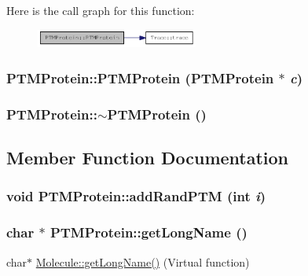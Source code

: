 Here is the call graph for this function:\nopagebreak
\begin{figure}[H]
\begin{center}
\leavevmode
\includegraphics[width=151pt]{classPTMProtein_ad7f9e5f107659b4c8a0c675f2aeb7b8b_cgraph}
\end{center}
\end{figure}
\hypertarget{classPTMProtein_a6a642aeb0eb0d1ca2a9120922637ca0d}{
\subsubsection[{PTMProtein}]{\setlength{\rightskip}{0pt plus 5cm}PTMProtein::PTMProtein ({\bf PTMProtein} $\ast$ {\em c})}}
\label{classPTMProtein_a6a642aeb0eb0d1ca2a9120922637ca0d}
\hypertarget{classPTMProtein_a1ca801134018861350af3eb36a359b48}{
\subsubsection[{$\sim$PTMProtein}]{\setlength{\rightskip}{0pt plus 5cm}PTMProtein::$\sim$PTMProtein ()}}
\label{classPTMProtein_a1ca801134018861350af3eb36a359b48}


\subsection{Member Function Documentation}
\hypertarget{classPTMProtein_a8ffaa9989ec5a1000bf5143f7abb1fff}{
\subsubsection[{addRandPTM}]{\setlength{\rightskip}{0pt plus 5cm}void PTMProtein::addRandPTM (int {\em i})}}
\label{classPTMProtein_a8ffaa9989ec5a1000bf5143f7abb1fff}
\hypertarget{classPTMProtein_a933492fe6252149290b4a2e9885588da}{
\subsubsection[{getLongName}]{\setlength{\rightskip}{0pt plus 5cm}char $\ast$ PTMProtein::getLongName ()}}
\label{classPTMProtein_a933492fe6252149290b4a2e9885588da}
char$\ast$ \hyperlink{classMolecule_a6d3c3fd4827a62dacfd9d7a7d3a7f6ea}{Molecule::getLongName()} (Virtual function)

